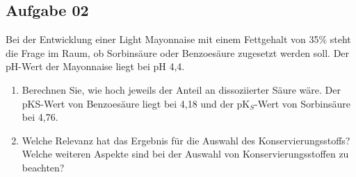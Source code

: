 \documentclass[a4paper,11pt]{article}
\newif\ifshowme
\begin{document}
\subsection*{Aufgabe 02}
Bei der Entwicklung einer Light Mayonnaise mit einem Fettgehalt von 35\% steht die Frage im
Raum, ob Sorbinsäure oder Benzoesäure zugesetzt werden soll. Der pH-Wert der Mayonnaise
liegt bei pH 4,4.
\begin{enumerate}[label=\alph*)]
\item Berechnen Sie, wie hoch jeweils der Anteil an dissoziierter Säure wäre. Der pKS-Wert
von Benzoesäure liegt bei 4,18 und der pK$_S$-Wert von Sorbinsäure bei 4,76.

\ifshowme
\antwort{

Säurekonstante nach Dissoziationsgrad $\alpha$ umstellen:
\begin{align*}
K &= \frac{[H^+] \cdot [A]}{[HA]} \\
K &= \frac{[H^+] \cdot \alpha}{1 - \alpha} \\
K \cdot (1-\alpha) & = [H^+] \cdot \alpha \\
K - \alpha \cdot K &= [H^+] \cdot \alpha \\
K &= [H^+] \cdot \alpha + \alpha \cdot K \\
K &= \alpha \cdot ([H^+] + K) \\
\alpha &= \frac{K}{[H^+] + K}
\end{align*}
Nun können wir einfach einsetzen mit $K= 10^{-pK_S}$ und $[H^+] = 10^{-pH}$ \pp

\textbf{Benzoesäure:}
\begin{align*}
\alpha &= \frac{10^{-4,18}}{10^{-4,4} + 10^{-4,18}} \\
&= 0,624
\end{align*}
Daher liegt der Anteil an undissoziierter Säure bei 1-0,624 = 0,3759 \RA 37,6 \%
\pp 
\textbf{Sorbinsäure:}
\begin{align*}
\alpha &= \frac{10^{-4,76}}{10^{-4,4} + 10^{-4,76}} \\
&= 0,303
\end{align*}
Daher liegt der Anteil an undissoziierter Säure bei 1-0,303 = 0,697 \RA 69,7 \%
}
\else
\fi

\item Welche Relevanz hat das Ergebnis für die Auswahl des Konservierungsstoffs? Welche
weiteren Aspekte sind bei der Auswahl von Konservierungsstoffen zu beachten?
\ifshowme
{}
\end{enumerate}
\end{document}
